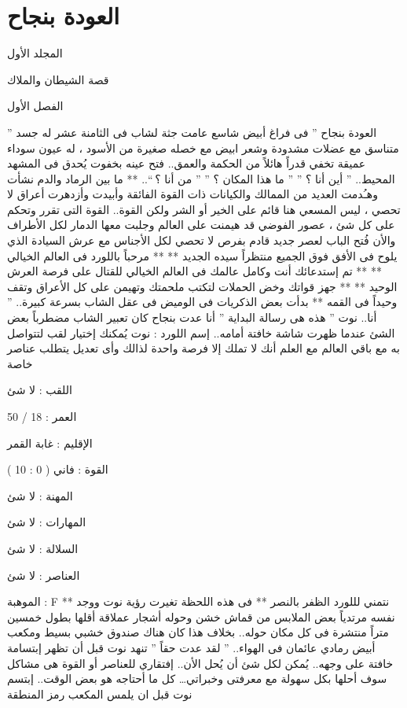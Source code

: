 \chapter{العودة بنجاح }

المجلد الأول

{ قصة الشيطان والملاك }

الفصل الأول

” العودة بنجاح ”
فى فراغ أبيض شاسع
عامت جثة لشاب فى الثامنة عشر له جسد متناسق مع عضلات مشدودة وشعر ابيض مع خصله صغيرة من الأسود ، له عيون سوداء عميقة تخفي قدراً هائلاً من الحكمة والعمق..
فتح عينه بخفوت يُحدق فى المشهد المحيط..
” أين أنا ؟ ”
” ما هذا المكان ؟ ”
” من أنا ؟ “..
** ما بين الرماد والدم نشأت وهـُدمت العديد من الممالك والكيانات ذات القوة الفائقة وأبيدت وأزدهرت أعراق لا تحصي ، ليس المسعي هنا قائم على الخير أو الشر ولكن القوة.. القوة التى تقرر وتحكم على كل شئ ، عصور الفوضي قد هيمنت على العالم وجلبت معها الدمار لكل الأطراف والأن فُتح الباب لعصر جديد قادم بفرص لا تحصي لكل الأجناس مع عرش السيادة الذي يلوح فى الأفق فوق الجميع منتظراً سيده الجديد **
** مرحباً باللورد فى العالم الخيالي **
** تم إستدعائك أنت وكامل عالمك فى العالم الخيالي للقتال على فرصة العرش الوحيد **
** جهز قواتك وخض الحملات لتكتب ملحمتك وتهيمن على كل الأعراق وتقف وحيداً فى القمه **
بدأت بعض الذكريات فى الوميض فى عقل الشاب بسرعة كبيرة..
” أنا.. نوت
” هذه هى رسالة البداية
” أنا عدت بنجاح
كان تعبير الشاب مضطرباً بعض الشئ عندما ظهرت شاشة خافتة أمامه..
إسم اللورد : نوت { يُمكنك إختيار لقب لتتواصل به مع باقي العالم مع العلم أنك لا تملك إلا فرصة واحدة لذالك وأى تعديل يتطلب عناصر خاصة }

اللقب : لا شئ

العمر : 18 / 50

الإقليم : غابة القمر

القوة : فاني ( 0 : 10 )

المهنة : لا شئ

المهارات : لا شئ

السلالة : لا شئ

العناصر : لا شئ

الموهبة : F
** نتمني لللورد الظفر بالنصر **
فى هذه اللحظة تغيرت رؤية نوت ووجد نفسه مرتدياً بعض الملابس من قماش خشن وحوله أشجار عملاقة أقلها بطول خمسين متراً منتشرة فى كل مكان حوله..
بخلاف هذا كان هناك صندوق خشبي بسيط ومكعب أبيض رمادي عائمان فى الهواء..
” لقد عدت حقاً ” تنهد نوت قبل أن تظهر إبتسامة خافتة على وجهه..
يُمكن لكل شئ أن يُحل الأن.. إفتقاري للعناصر أو القوة هى مشاكل سوف أحلها بكل سهولة مع معرفتى وخبراتي… كل ما أحتاجه هو بعض الوقت..
إبتسم نوت قبل ان يلمس المكعب
رمز المنطقة

